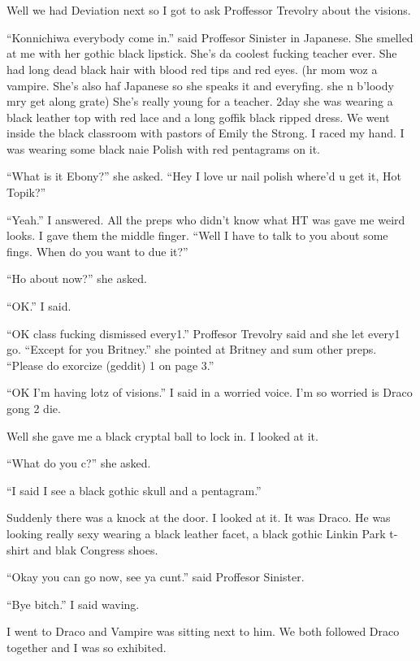 \section{\chaptername~\thesection}



Well we had Deviation next so I got to ask Proffessor Trevolry about the visions.

\enquote{Konnichiwa everybody come in.} said Proffesor Sinister in Japanese. She smelled at me with her gothic black lipstick. She's da coolest fucking teacher ever. She had long dead black hair with blood red tips and red eyes. (hr mom woz a vampire. She's also haf Japanese so she speaks it and everyfing. she n b'loody mry get along grate) She's really young for a teacher. 2day she was wearing a black leather top with red lace and a long goffik black ripped dress. We went inside the black classroom with pastors of Emily the Strong. I raced my hand. I was wearing some black naie Polish with red pentagrams on it.

\enquote{What is it Ebony?} she asked. \enquote{Hey I love ur nail polish where'd u get it, Hot Topik?}

\enquote{Yeah.} I answered. All the preps who didn't know what HT was gave me weird looks. I gave them the middle finger. \enquote{Well I have to talk to you about some fings. When do you want to due it?}

\enquote{Ho about now?} she asked.

\enquote{OK.} I said.

\enquote{OK class fucking dismissed every1.} Proffesor Trevolry said and she let every1 go. \enquote{Except for you Britney.} she pointed at Britney and sum other preps. \enquote{Please do exorcize (geddit) 1 on page 3.}

\enquote{OK I'm having lotz of visions.} I said in a worried voice. I'm so worried is Draco gong 2 die.

Well she gave me a black cryptal ball to lock in. I looked at it.

\enquote{What do you c?} she asked.

\enquote{I said I see a black gothic skull and a pentagram.}

Suddenly there was a knock at the door. I looked at it. It was Draco. He was looking really sexy wearing a black leather facet, a black gothic Linkin Park t-shirt and blak Congress shoes.

\enquote{Okay you can go now, see ya cunt.} said Proffesor Sinister.

\enquote{Bye bitch.} I said waving.

I went to Draco and Vampire was sitting next to him. We both followed Draco together and I was so exhibited.

